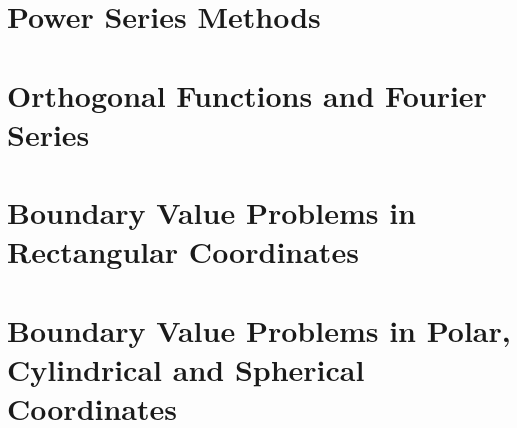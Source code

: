 \documentclass{tufte-book}
\theoremstyle{break}
\begin{document}
\part{Power Series Methods}













\part{Orthogonal Functions and Fourier Series}









\part{Boundary Value Problems in Rectangular Coordinates}














\part{Boundary Value Problems in Polar, Cylindrical and Spherical Coordinates}










\end{document}
